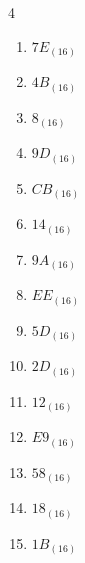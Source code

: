 \begin{multicols}{4}
\begin{enumerate}
        \phantom{$=75$}

  \item $7E_{(16)}$

        \phantom{$=126$}

  \item $4B_{(16)}$

        \phantom{$=75$}

  \item $8_{(16)}$

        \phantom{$=8$}

  \item $9D_{(16)}$

        \phantom{$=157$}

  \item $CB_{(16)}$

        \phantom{$=203$}

  \item $14_{(16)}$

        \phantom{$=20$}

  \item $9A_{(16)}$

        \phantom{$=154$}

  \item $EE_{(16)}$

        \phantom{$=238$}

  \item $5D_{(16)}$

        \phantom{$=93$}

  \item $2D_{(16)}$

        \phantom{$=45$}

  \item $12_{(16)}$

        \phantom{$=18$}

\columnbreak %

  \item $E9_{(16)}$

        \phantom{$=233$}

  \item $58_{(16)}$

        \phantom{$=88$}

  \item $18_{(16)}$

        \phantom{$=24$}

  \item $1B_{(16)}$

        \phantom{$=27$}


\end{enumerate}
\end{multicols}
